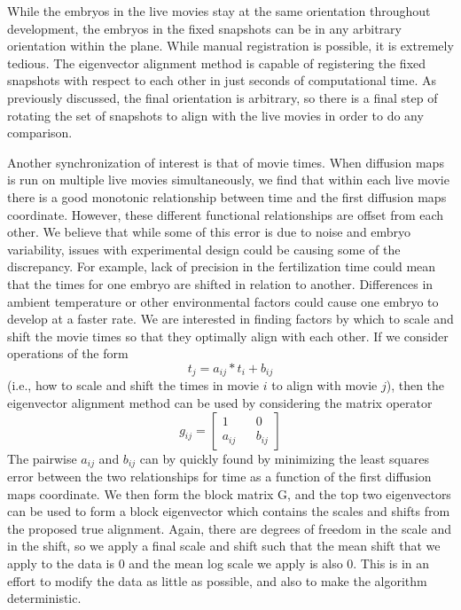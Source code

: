 \documentclass[12pt]{article}
\begin{document}
While the embryos in the live movies stay at the same orientation throughout development, the embryos in the fixed snapshots can be in any arbitrary orientation within the plane. While manual registration is possible, it is extremely tedious. The eigenvector alignment method is capable of registering the fixed snapshots with respect to each other in just seconds of computational time. As previously discussed, the final orientation is arbitrary, so there is a final step of rotating the set of snapshots to align with the live movies in order to do any comparison. \vspace{1mm}

Another synchronization of interest is that of movie times.  When diffusion maps is run on multiple live movies simultaneously, we find that within each live movie there is a good monotonic relationship between time and the first diffusion maps coordinate. However, these different functional relationships are offset from each other. We believe that while some of this error is due to noise and embryo variability, issues with experimental design could be causing some of the discrepancy. For example, lack of precision in the fertilization time could mean that the times for one embryo are shifted in relation to another. Differences in ambient temperature or other environmental factors could cause one embryo to develop at a faster rate. We are interested in finding factors by which to scale and shift the movie times so that they optimally align with each other. If we consider operations of the form
\[
t_j = a_{ij}*t_i+b_{ij}
\]
(i.e., how to scale and shift the times in movie $i$ to align with movie $j$), then the eigenvector alignment method can be used by considering the matrix operator
\[
g_{ij}=
\begin{bmatrix}
1 && 0\\
a_{ij} && b_{ij}
\end{bmatrix}
\]
The pairwise $a_{ij}$ and $b_{ij}$ can by quickly found by minimizing the least squares error between the two relationships for time as a function of the first diffusion maps coordinate. We then form the block matrix G, and the top two eigenvectors can be used to form a block eigenvector which contains the scales and shifts from the proposed true alignment. Again, there are degrees of freedom in the scale and in the shift, so we apply a final scale and shift such that the mean shift that we apply to the data is 0 and the mean log scale we apply is also 0. This is in an effort to modify the data as little as possible, and also to make the algorithm deterministic.
\end{document}
